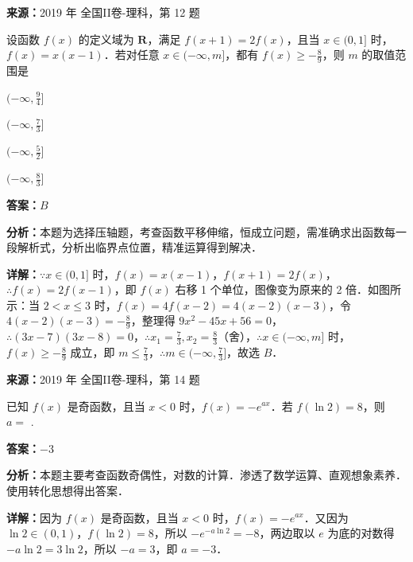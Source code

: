 \begin{question}[points=5]
\textbf{来源：}2019 年 全国II卷-理科，第 12 题\par
设函数 $f(x)$ 的定义域为 $\mathbf{R}$，满足 $f(x+1)=2f(x)$，且当 $x\in(0,1]$ 时，$f(x)=x(x-1)$．若对任意 $x\in(-\infty,m]$，都有 $f(x)\geq -\frac{8}{9}$，则 $m$ 的取值范围是
\begin{choices}
  \item $(-\infty,\frac{9}{4}]$
  \item $(-\infty,\frac{7}{3}]$
  \item $(-\infty,\frac{5}{2}]$
  \item $(-\infty,\frac{8}{3}]$
\end{choices}
\begin{solution}
\textbf{答案：}$B$

\textbf{分析：}本题为选择压轴题，考查函数平移伸缩，恒成立问题，需准确求出函数每一段解析式，分析出临界点位置，精准运算得到解决．

\textbf{详解：}$\because x\in(0,1]$ 时，$f(x)=x(x-1)$，$f(x+1)=2f(x)$，$\therefore f(x)=2f(x-1)$，即 $f(x)$ 右移 1 个单位，图像变为原来的 2 倍．如图所示：当 $2<x\leq 3$ 时，$f(x)=4f(x-2)=4(x-2)(x-3)$，令 $4(x-2)(x-3)=-\frac{8}{9}$，整理得 $9x^2-45x+56=0$，$\therefore (3x-7)(3x-8)=0$，$\therefore x_1=\frac{7}{3},x_2=\frac{8}{3}$（舍），$\therefore x\in(-\infty,m]$ 时，$f(x)\geq -\frac{8}{9}$ 成立，即 $m\leq \frac{7}{3}$，$\therefore m\in(-\infty,\frac{7}{3}]$，故选 $B$．
\end{solution}
\end{question}

\begin{question}[points=5]
\textbf{来源：}2019 年 全国II卷-理科，第 14 题\par
已知 $f(x)$ 是奇函数，且当 $x<0$ 时，$f(x)=-e^{ax}$．若 $f(\ln 2)=8$，则 $a=$ .
\fillin[{$-3$}]
\begin{solution}
\textbf{答案：}$-3$

\textbf{分析：}本题主要考查函数奇偶性，对数的计算．渗透了数学运算、直观想象素养．使用转化思想得出答案．

\textbf{详解：}因为 $f(x)$ 是奇函数，且当 $x<0$ 时，$f(x)=-e^{ax}$．又因为 $\ln 2\in(0,1)$，$f(\ln 2)=8$，所以 $-e^{-a\ln 2}=-8$，两边取以 $e$ 为底的对数得 $-a\ln 2=3\ln 2$，所以 $-a=3$，即 $a=-3$．
\end{solution}
\end{question}

